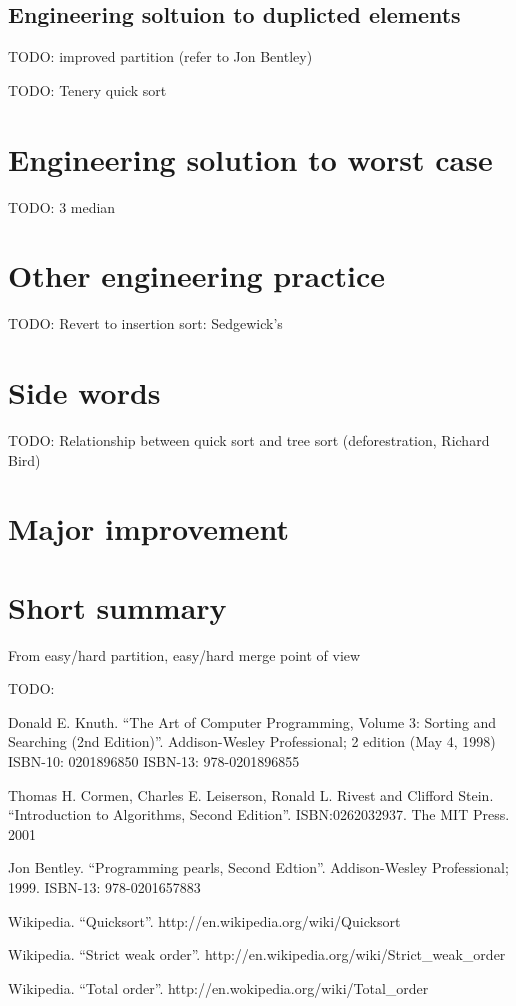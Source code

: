 \documentclass{article}
\begin{document}
\subsection{Engineering soltuion to duplicted elements}
TODO: improved partition (refer to Jon Bentley)

TODO: Tenery quick sort

\section{Engineering solution to worst case}
TODO: 3 median

\section{Other engineering practice}
TODO: Revert to insertion sort: Sedgewick's 

\section{Side words}
TODO: Relationship between quick sort and tree sort (deforestration, Richard Bird)


\section{Major improvement}


\section{Short summary} 
From easy/hard partition, easy/hard merge point of view

TODO:

\begin{thebibliography}{99}

Donald E. Knuth. ``The Art of Computer Programming, Volume 3: Sorting and Searching (2nd Edition)''. Addison-Wesley Professional; 2 edition (May 4, 1998) ISBN-10: 0201896850 ISBN-13: 978-0201896855

Thomas H. Cormen, Charles E. Leiserson, Ronald L. Rivest and Clifford Stein. 
``Introduction to Algorithms, Second Edition''. ISBN:0262032937. The MIT Press. 2001

Jon Bentley. ``Programming pearls, Second Edtion''. Addison-Wesley Professional; 1999. ISBN-13: 978-0201657883

Wikipedia. ``Quicksort''. http://en.wikipedia.org/wiki/Quicksort

Wikipedia. ``Strict weak order''. http://en.wikipedia.org/wiki/Strict\_weak\_order

Wikipedia. ``Total order''. http://en.wokipedia.org/wiki/Total\_order

\end{thebibliography}

\ifx\wholebook\relax\else
\end{document}
